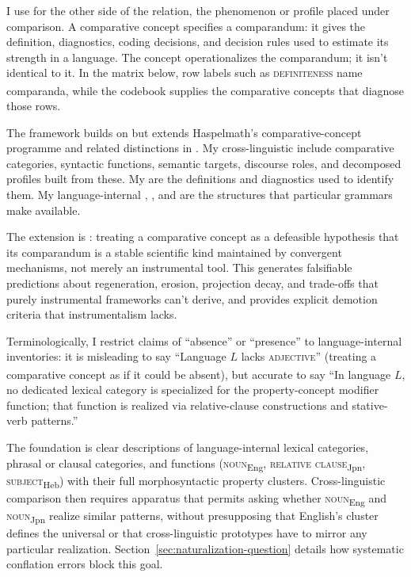 \documentclass[12pt]{article}
\begin{document}
I use  for the other side of the relation, the phenomenon or profile placed under comparison. A comparative concept specifies a comparandum: it gives the definition, diagnostics, coding decisions, and decision rules used to estimate its strength in a language. The concept operationalizes the comparandum; it isn't identical to it. In the matrix below, row labels such as \textsc{definiteness}\textsubscript{\Cross} name comparanda, while the codebook supplies the comparative concepts that diagnose those rows.

The framework builds on but extends Haspelmath's comparative-concept programme and related distinctions in \textcite{croft2001}. My cross-linguistic  include comparative categories, syntactic functions, semantic targets, discourse roles, and decomposed profiles built from these. My  are the definitions and diagnostics used to identify them. My language-internal , , and  are the structures that particular grammars make available.

The extension is : treating a comparative concept as a defeasible hypothesis that its comparandum is a stable scientific kind maintained by convergent mechanisms, not merely an instrumental tool. This generates falsifiable predictions about regeneration, erosion, projection decay, and trade-offs that purely instrumental frameworks can't derive, and provides explicit demotion criteria that instrumentalism lacks.

Terminologically, I restrict claims of \enquote{absence} or \enquote{presence} to language-internal inventories: it is misleading to say \enquote{Language $L$ lacks \textsc{adjective}\textsubscript{\Cross}} (treating a comparative concept as if it could be absent), but accurate to say \enquote{In language $L$, no dedicated lexical category is specialized for the property-concept modifier function; that function is realized via relative-clause constructions and stative-verb patterns.}

The foundation is clear descriptions of language-internal lexical categories, phrasal or clausal categories, and functions (\textsc{noun}\textsubscript{Eng}, \textsc{relative clause}\textsubscript{Jpn}, \textsc{subject}\textsubscript{Heb}) with their full morphosyntactic property clusters. Cross-linguistic comparison then requires apparatus that permits asking whether \textsc{noun}\textsubscript{Eng} and \textsc{noun}\textsubscript{Jpn} realize similar patterns, without presupposing that English's cluster defines the universal or that cross-linguistic prototypes have to mirror any particular realization. Section~\ref{sec:naturalization-question} details how systematic conflation errors block this goal.
\end{document}
